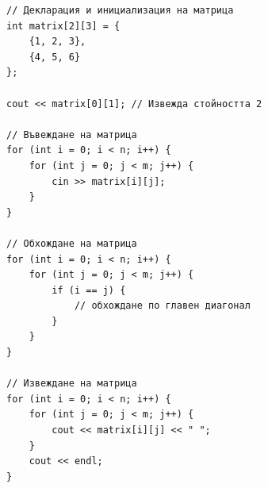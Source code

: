 \documentclass{article}
\begin{document}
\begin{lstlisting}[style=cpp]
// Декларация и инициализация на матрица
int matrix[2][3] = {
    {1, 2, 3},
    {4, 5, 6}
};

cout << matrix[0][1]; // Извежда стойността 2

// Въвеждане на матрица
for (int i = 0; i < n; i++) {
    for (int j = 0; j < m; j++) {
        cin >> matrix[i][j];
    }
}

// Обхождане на матрица
for (int i = 0; i < n; i++) {
    for (int j = 0; j < m; j++) {
        if (i == j) {
            // обхождане по главен диагонал
        }
    }
}

// Извеждане на матрица
for (int i = 0; i < n; i++) {
    for (int j = 0; j < m; j++) {
        cout << matrix[i][j] << " ";
    }
    cout << endl;
}
\end{lstlisting}
\end{document}
